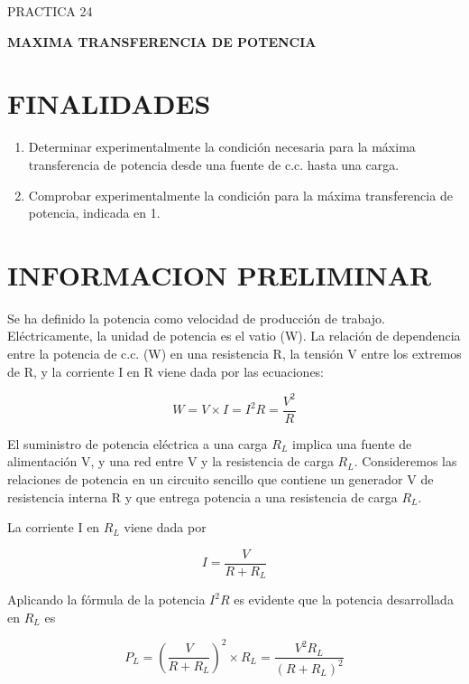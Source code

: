 \documentclass{article}
\begin{document}
\begin{center}
    \large
    PRACTICA 24
    \vspace{0.5cm}

    \huge
    \textbf{MAXIMA TRANSFERENCIA DE POTENCIA}
\end{center}

\section*{FINALIDADES}
\begin{enumerate}
    \item Determinar experimentalmente la condición necesaria para la máxima transferencia de potencia desde una fuente de c.c. hasta una carga.
    \item Comprobar experimentalmente la condición para la máxima transferencia de potencia, indicada en 1.
\end{enumerate}

\section*{INFORMACION PRELIMINAR}

Se ha definido la potencia como velocidad de producción de trabajo. Eléctricamente, la unidad de potencia es el vatio (W). La relación de dependencia entre la potencia de c.c. (W) en una resistencia R, la tensión V entre los extremos de R, y la corriente I en R viene dada por las ecuaciones:

\begin{equation}
W = V \times I = I^2 R = \frac{V^2}{R}
\end{equation}

El suministro de potencia eléctrica a una carga $R_L$ implica una fuente de alimentación V, y una red entre V y la resistencia de carga $R_L$. Consideremos las relaciones de potencia en un circuito sencillo que contiene un generador V de resistencia interna R y que entrega potencia a una resistencia de carga $R_L$.

La corriente I en $R_L$ viene dada por

\begin{equation}
I = \frac{V}{R + R_L}
\end{equation}

Aplicando la fórmula de la potencia $I^2 R$ es evidente que la potencia desarrollada en $R_L$ es

\begin{equation}
P_L = \left(\frac{V}{R + R_L}\right)^2 \times R_L = \frac{V^2 R_L}{(R + R_L)^2}
\end{equation}
\end{document}
